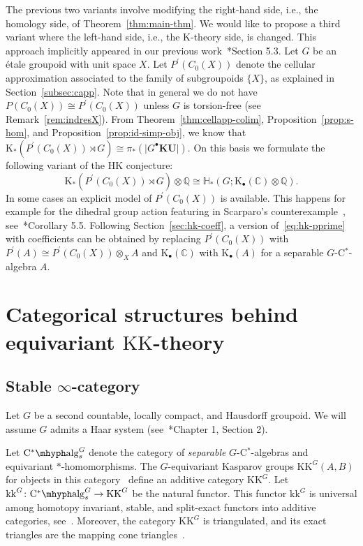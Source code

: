 \documentclass[a4paper,reqno]{amsart}
\theoremstyle{plain}
\theoremstyle{definition}
\theoremstyle{remark}
\numberwithin{equation}{section}
\newcommand{\rK}{\mathrm{K}}
\newcommand{\dC}{\mathbb{C}}
\newcommand{\dH}{\mathbb{H}}
\newcommand{\dQ}{\mathbb{Q}}
\newcommand{\CstAlg}{\mathrm{C}^*\mhyph\mathrm{alg}}
\newcommand{\KK}{\mathrm{KK}}
\newcommand{\kk}{\mathrm{kk}}
\newcommand{\gr}[1]{\lvert #1\rvert}
\newcommand{\KU}{\mathbf{KU}}
\begin{document}
The previous two variants involve modifying the right-hand side, i.e., the homology side, of Theorem~\ref{thm:main-thm}. We would like to propose a third variant where the left-hand side, i.e., the $\rK$-theory side, is changed. This approach implicitly appeared in our previous work~\cite{py:part-one}*{Section 5.3}. Let $G$ be an étale groupoid with unit space $X$. Let $P^\prime(C_0(X))$ denote the cellular approximation associated to the family of subgroupoids $\{X\}$, as explained in Section~\ref{subsec:capp}. Note that in general we do not have $P(C_0(X))\cong P^\prime(C_0(X))$ unless $G$ is torsion-free (see Remark~\ref{rem:indresX}). From Theorem~\ref{thm:cellapp-colim}, Proposition~\ref{prop:s-hom}, and Proposition~\ref{prop:id-simp-obj}, we know that $\rK_*(P^\prime(C_0(X))\rtimes G)\cong  \pi_*(\gr{G^{\bullet}\KU})$. On this basis we formulate the following variant of the HK conjecture:
\begin{equation}\label{eq:hk-pprime}
\rK_*(P^\prime(C_0(X))\rtimes G)\otimes \dQ \cong \dH_*(G;\rK_\bullet(\dC)\otimes\dQ).
\end{equation}
In some cases an explicit model of $P^\prime(C_0(X))$ is available. This happens for example for the dihedral group action featuring in Scarparo's counterexample~\cite{scarparo:homod}, see~\cite{py:part-one}*{Corollary 5.5}. Following Section~\ref{sec:hk-coeff}, a version of~\eqref{eq:hk-pprime} with coefficients can be obtained by replacing $P^\prime(C_0(X))$ with $P^\prime(A)\cong P^\prime(C_0(X))\otimes_X A$ and $\rK_\bullet(\dC)$ with $\rK_\bullet(A)$ for a separable $G$-C$^*$-algebra $A$.


\appendix
\section{Categorical structures behind equivariant \texorpdfstring{$\KK$}{KK}-theory}\label{sec:kkg-stable}

\subsection{Stable $\infty$-category}

Let $G$ be a second countable, locally compact, and Hausdorff groupoid. We will assume $G$ admits a Haar system (see~\cite{ren:group}*{Chapter 1, Section 2}).

Let $\CstAlg_s^G$ denote the category of \emph{separable} $G$-C$^*$-algebras and equivariant $\ast$-homomorphisms.
The $G$-equivariant Kasparov groups $\KK^G(A,B)$ for objects in this category~\cite{lg:kk} define an additive category $\KK^G$.
Let $\kk^G\colon \CstAlg_s^G \to \KK^G$ be the natural functor.
This functor $\kk^G$ is universal among homotopy invariant, stable, and split-exact functors into additive categories, see~\cite{py:part-one}.
Moreover, the category $\KK^G$ is triangulated, and its exact triangles are the mapping cone triangles~\cites{val:kthpgrp,py:part-one}.
\end{document}
